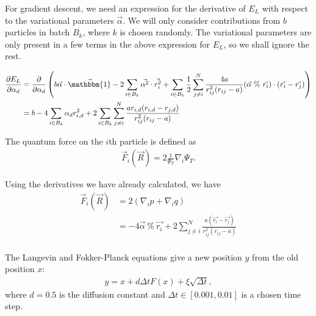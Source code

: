 \documentclass[12pt]{article}
\begin{document}
\noindent For gradient descent, we need an expression for the derivative of $E_L$ with respect to the variational parameters $\vec{\alpha}$. We will only consider contributions from $b$ particles in batch $B_k$, where $k$ is chosen randomly. The variational parameters are only present in a few terms in the above expression for $E_L$, so we shall ignore the rest. 

\begin{align*}
\frac{\partial E_L}{\partial \alpha_d} 
&= \frac{\partial}{\partial \alpha_d} \left( 
b\vec{\alpha}\cdot \vec{\mathbbm{1}} - 2 \sum_{i \in B_k} \vec{\alpha^2}\cdot \vec{r_i^2} 
+ \sum_{i\in B_k} \frac{1}{2} \sum_{j\neq i}^N \frac{4a}{r_{ij}^2(r_{ij}-a)} (\vec{\alpha} \  \% \ \vec{r_i}) \cdot (\vec{r_i}-\vec{r_j})
 \right)\\
 &= b -4 \sum_{i \in B_k} \alpha_d r_{i,d}^2 +2 \sum_{i \in B_k} \sum_{j \neq i}^N \frac{a r_{i,d}(r_{i,d}-r_{j,d})}{r_{ij}^2(r_{ij}-a)}
\end{align*}



The quantum force on the $i$th particle is defined as 
\begin{align}
\vec{F}_i(\vec{R}) = 2 \frac{1}{\Psi_T} \nabla_i \Psi_T.
\end{align}

Using the derivatives we have already calculated, we have
\begin{align*}
\vec{F}_i(\vec{R}) &= 2 ( \nabla_i p + \nabla_i q)\\
&= -4\vec{\alpha} \ \% \ \vec{r_i} + 2 \sum_{j\neq i}^N \frac{a(\vec{r_i}-\vec{r_j})}{r_{ij}^2(r_{ij}-a)}  \\
\end{align*}

\noindent The Langevin and Fokker-Planck equations give a new position $y$ from the old position $x$:
\begin{align}
y = x + d\Delta tF(x) + \xi \sqrt{\Delta t},
\end{align}
where $d=0.5$ is the diffusion constant and $\Delta t \in [0.001,0.01]$ is a chosen time step. \\
\end{document}
